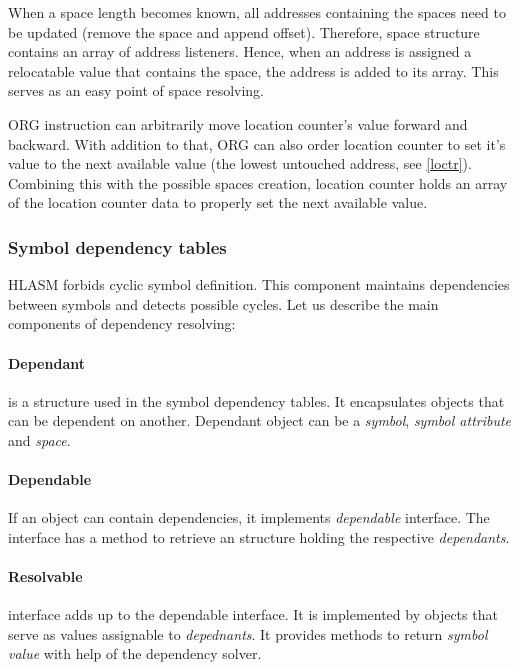 When a space length becomes known, all addresses containing the spaces need to be updated (remove the space and append offset). Therefore, space structure contains an array of address listeners. Hence, when an address is assigned a relocatable value that contains the space, the address is added to its array. This serves as an easy point of space resolving.

\vspace{0.5cm}

ORG instruction can arbitrarily move location counter's value forward and backward. With addition to that, ORG  can also order location counter to set it's value to the next available value (the lowest untouched address, see \cref{loctr}). Combining this with the possible spaces creation, location counter holds an array of the location counter data to properly set the next available value.

\subsubsection{Symbol dependency tables}

HLASM forbids cyclic symbol definition. This component maintains dependencies between symbols and detects possible cycles.
Let us describe the main components of dependency resolving:

\paragraph*{Dependant} is a structure used in the symbol dependency tables. It encapsulates objects that can be dependent on another. Dependant object can be a \emph{symbol}, \emph{symbol attribute} and \emph{space}.

\paragraph*{Dependable} If an object can contain dependencies, it implements \emph{dependable} interface. The interface has a method to retrieve an structure holding the respective \emph{dependants}. 

\paragraph*{Resolvable} interface adds up to the dependable interface. It is implemented by objects that serve as values assignable to \emph{depednants}. It provides methods to return \emph{symbol value} with help of the dependency solver. 

